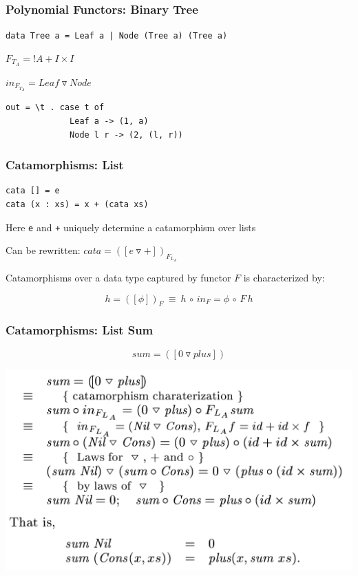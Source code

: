 \documentclass{beamer}
\begin{document}
\begin{frame}[fragile]
  \frametitle{Polynomial Functors: Binary Tree}
\texttt{data Tree a = Leaf a | Node (Tree a) (Tree a)}

\vspace{0.5cm}

$F_{T_A} = !A + I \times I$

\vspace{0.5cm}

$in_{F_{T_A}} = Leaf \triangledown Node$

\vspace{0.5cm}

\begin{verbatim}
out = \t . case t of
             Leaf a -> (1, a)
             Node l r -> (2, (l, r))
\end{verbatim}

\end{frame}

\begin{frame}[fragile]
  \frametitle{Catamorphisms: List}

\begin{verbatim}
cata [] = e
cata (x : xs) = x + (cata xs)
\end{verbatim}

Here \texttt{e} and \texttt{+} uniquely determine a catamorphism over lists

\vspace{0.3cm}

Can be rewritten: $cata = ([e \triangledown +])_{F_{L_A}}$

\vspace{0.3cm}

Catamorphisms over a data type captured by functor $F$ is characterized by:

$$
h = ([\phi])_F \ \equiv \ h \, \circ \, in_F = \phi \, \circ \, F \, h
$$
\end{frame}


\begin{frame}[fragile]
  \frametitle{Catamorphisms: List Sum}
$$sum = ([0 \triangledown plus])$$

\includegraphics[width=\textwidth]{sum.png}
\end{frame}
\end{document}

